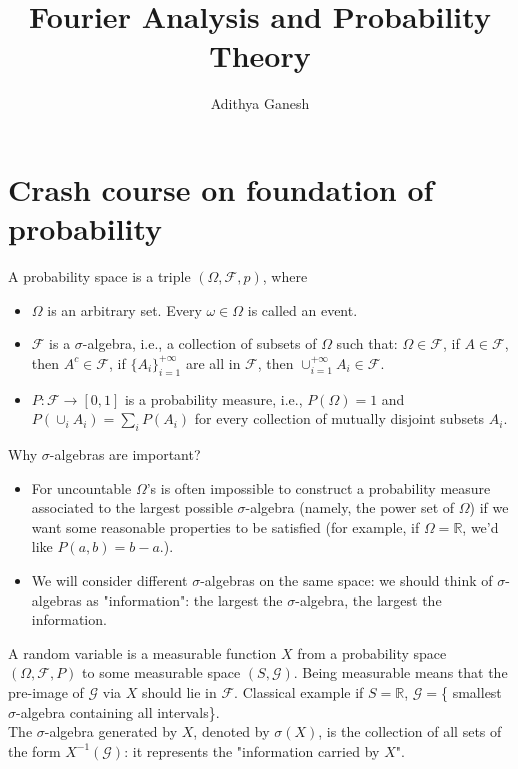 \documentclass[12pt]{article}
\title{Fourier Analysis and Probability Theory}
\author{Adithya Ganesh}
\begin{document}
\maketitle
\section{Crash course on foundation of probability}

A probability space is a triple $(\Omega, \mathcal F, p)$, where
\begin{itemize}
\item $\Omega$ is an arbitrary set. Every $\omega\in \Omega$ is called an event. 
\item $\mathcal F$ is a $\sigma$-algebra, i.e., a collection of subsets of $\Omega$ such that: $\Omega\in \mathcal F$, if $A\in \mathcal F$, then $A^c\in \mathcal F$, if $\{A_i\}_{i=1}^{+\infty}$ are all in $\mathcal F$, then $\cup_{i=1}^{+\infty}A_i\in \mathcal F$. 
\item $P:\mathcal F\rightarrow [0,1]$ is a probability measure, i.e., $P(\Omega)=1$ and $P(\cup_i A_i)=\sum_i P(A_i)$ for every collection of mutually disjoint subsets $A_i$. 
\end{itemize}
\centerline{}
\begin{remark}
Why $\sigma$-algebras are important?
\begin{itemize}
\item For uncountable $\Omega$'s is often impossible to construct a probability measure associated to the largest possible $\sigma$-algebra (namely, the power set of $\Omega$) if we want some reasonable properties to be satisfied (for example, if $\Omega=\mathbb R$, we'd like $P(a,b)=b-a$.). 
\item We will consider different $\sigma$-algebras on the same space: we should think of $\sigma$-algebras as "information": the largest the $\sigma$-algebra, the largest the information.
\end{itemize}
\end{remark}
\centerline{}
A random variable is a measurable function $X$ from a probability space $(\Omega,\mathcal F, P)$ to some measurable space $(S, \mathcal G)$. Being measurable means that the pre-image of $\mathcal G$ via $X$ should lie in $\mathcal F$. Classical example if $S=\mathbb R$, $\mathcal G=$\{ smallest $\sigma$-algebra containing all intervals\}. \\ The $\sigma$-algebra generated by $X$, denoted by $\sigma(X)$, is the collection of all sets of the form $X^{-1}(\mathcal G)$: it represents the "information carried by $X$".\\ \\
\end{document}
